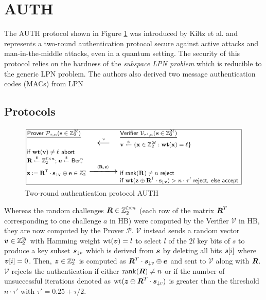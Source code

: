 \documentclass[11pt,a4paper]{article}
\begin{document}
\newpage

 

\section{AUTH}

The AUTH protocol shown in Figure \ref{fig3} was introduced by Kiltz et al. \cite{Kiltz2017} and represents a two-round authentication protocol secure against active attacks and man-in-the-middle attacks, even in a quantum setting. The security of this protocol relies on the hardness of the \textit{subspace LPN problem} which is reducible to the generic LPN problem. The authors also derived two message authentication codes (MACs) from LPN 

\subsection{Protocols}

\begin{figure}[h]
	\includegraphics[width=13cm]{auth}
	\centering
	\caption{Two-round authentication protocol AUTH}
	\label{fig3}
\end{figure}

Whereas the random challenges $\boldsymbol{R} \in \mathbb{Z}_2^{l \times n}$ (each row of the matrix $\boldsymbol{R}^T$ corresponding to one challenge $a$ in HB) were computed by the Verifier $\mathcal{V}$ in HB, they are now computed by the Prover $\mathcal{P}$.
$\mathcal{V}$ instead sends a random vector $\boldsymbol{v} \in \mathbb{Z}_2^{2l}$ with Hamming weight $\text{wt}(\boldsymbol{v}) = l$ to select $l$ of the $2l$ key bits of $s$ to produce a key subset $\boldsymbol{s}_{\downarrow v}$ which is derived from $\boldsymbol{s}$ by deleting all bits $\boldsymbol{s}[i]$ where $\boldsymbol{v}[i] = 0$.
Then, $\boldsymbol{z} \in \mathbb{Z}_2^n$ is computed as $\boldsymbol{R}^T \cdot \boldsymbol{s}_{\downarrow v} \oplus \boldsymbol{e}$ and sent to $\mathcal{V}$ along with $\boldsymbol{R}$.
$\mathcal{V}$ rejects the authentication if either $\text{rank}(\boldsymbol{R}) \neq n$ or if the number of unsuccessful iterations denoted as $\text{wt}(\boldsymbol{z} \oplus \boldsymbol{R}^T \cdot \boldsymbol{s}_{\downarrow v})$ is greater than the threshold $n \cdot \tau'$ with $\tau' = 0.25 + \tau/2$.
\end{document}
